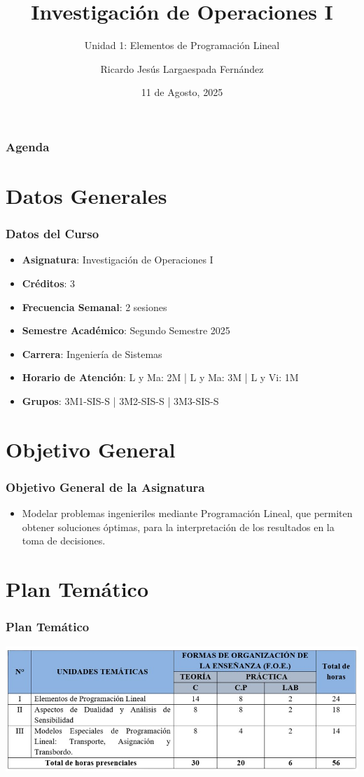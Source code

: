 \documentclass{beamer}
\title{Investigación de Operaciones I}
\subtitle{Unidad 1: Elementos de Programación Lineal}
\author{Ricardo Jesús Largaespada Fernández}
\institute{Ingeniería de Sistemas, DACTIC, UNI}
\date{11 de Agosto, 2025}
\begin{document}
\frame{\titlepage}

\begin{frame}
\frametitle{Agenda}
\tableofcontents
\end{frame}

\section{Datos Generales}
\begin{frame}
\frametitle{Datos del Curso}
\begin{itemize}
    \item \textbf{Asignatura}: Investigación de Operaciones I
    \item \textbf{Créditos}: 3
    \item \textbf{Frecuencia Semanal}: 2 sesiones
    \item \textbf{Semestre Académico}: Segundo Semestre 2025
    \item \textbf{Carrera}: Ingeniería de Sistemas
    \item \textbf{Horario de Atención}: L y Ma: 2M | L y Ma: 3M | L y Vi: 1M
    \item \textbf{Grupos}: 3M1-SIS-S | 3M2-SIS-S | 3M3-SIS-S
\end{itemize}
\end{frame}

\section{Objetivo General}
\begin{frame}
\frametitle{Objetivo General de la Asignatura}
\begin{itemize}
    \item Modelar problemas ingenieriles mediante Programación Lineal, que permiten obtener soluciones óptimas, para la interpretación de los resultados en la toma de decisiones.
\end{itemize}
\end{frame}

\section{Plan Temático}

\begin{frame}
\frametitle{Plan Temático}
\begin{center}
    \includegraphics[scale=.3]{images/plan_tematico.png}
\end{center}
\end{frame}
\end{document}
